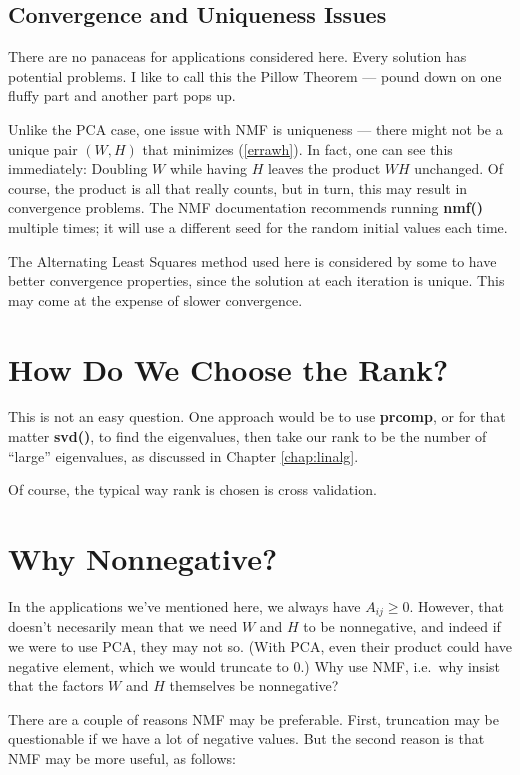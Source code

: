 \subsection{Convergence and Uniqueness Issues}

There are no panaceas for applications considered here.  Every solution
has potential problems.  I like to call this the Pillow Theorem ---
pound down on one fluffy part and another part pops up.

Unlike the PCA case, one issue with NMF is uniqueness --- there might
not be a unique pair $(W,H)$ that minimizes (\ref{errawh}).  In fact,
one can see this immediately:  Doubling $W$ while having $H$ leaves the
product $WH$ unchanged.  Of course, the product is all that really
counts, but in turn, this may result in convergence problems. The NMF
documentation recommends running {\bf nmf()} multiple times; it will use
a different seed for the random initial values each time.

The Alternating Least Squares method used here is considered by some to
have better convergence properties, since the solution at each iteration
is unique.  This may come at the expense of slower convergence.

\section{How Do We Choose the Rank?}
\label{chooserank}

This is not an easy question.  One approach would be to use
\textbf{prcomp}, or for that matter \textbf{svd()}, to find the
eigenvalues, then take our rank to be the number of ``large''
eigenvalues, as discussed in Chapter \ref{chap:linalg}.  

Of course, the typical way rank is chosen is cross validation.

\section{Why Nonnegative?}

In the applications we've mentioned here, we always have $A_{ij} \geq 0$.
However, that doesn't necesarily mean that we need $W$ and $H$ to be
nonnegative, and indeed if we were to use PCA, they may not so.  (With
PCA, even their product could have negative element, which we would
truncate to 0.)  Why use NMF, i.e.\ why insist that the factors $W$ and
$H$ themselves be nonnegative?

There are a couple of reasons NMF may be preferable.  First, truncation
may be questionable if we have a lot of negative values.  But the second
reason is that NMF may be more useful, as follows:

